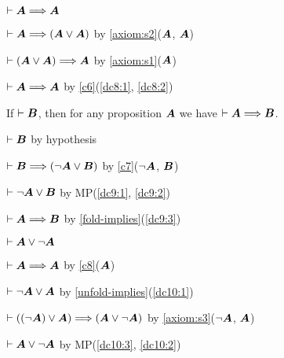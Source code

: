 \begin{dc}\label{c8}%
$\vdash\boldsymbol{A}\Longrightarrow\boldsymbol{A}$
\end{dc}

\begin{pf}
\item\label{dc8:1}\Pf $\vdash\boldsymbol{A}\Longrightarrow(\boldsymbol{A}\lor\boldsymbol{A})$
  by \ref{axiom:s2}($\boldsymbol{A}$, $\boldsymbol{A}$)
\item\label{dc8:2} $\vdash(\boldsymbol{A}\lor\boldsymbol{A})\Longrightarrow\boldsymbol{A}$
  by \ref{axiom:s1}($\boldsymbol{A}$)
\item $\vdash\boldsymbol{A}\Longrightarrow\boldsymbol{A}$ by
  \ref{c6}(\ref{dc8:1}, \ref{dc8:2})
\end{pf}

\begin{dc}\label{c9}%
If $\vdash\boldsymbol{B}$, then for any proposition $\boldsymbol{A}$
we have $\vdash\boldsymbol{A}\Longrightarrow\boldsymbol{B}$.
\end{dc}

\begin{pf}
\item\label{dc9:1}\Pf $\vdash\boldsymbol{B}$ by hypothesis
\item\label{dc9:2} $\vdash\boldsymbol{B}\Longrightarrow(\neg\boldsymbol{A}\lor\boldsymbol{B})$
  by \ref{c7}($\neg{\boldsymbol{A}}$, $\boldsymbol{B}$)
\item\label{dc9:3} $\vdash\neg\boldsymbol{A}\lor\boldsymbol{B}$ by
  MP(\ref{dc9:1}, \ref{dc9:2})
\item $\vdash\boldsymbol{A}\Longrightarrow\boldsymbol{B}$ by \ref{fold-implies}(\ref{dc9:3})
\end{pf}

\begin{dc}\label{c10}%
$\vdash\boldsymbol{A}\lor\neg\boldsymbol{A}$
\end{dc}
\begin{pf}
\item\label{dc10:1}\Pf $\vdash\boldsymbol{A}\Longrightarrow\boldsymbol{A}$
  by \ref{c8}($\boldsymbol{A}$)
\item\label{dc10:2} $\vdash\neg\boldsymbol{A}\lor\boldsymbol{A}$
  by \ref{unfold-implies}(\ref{dc10:1})
\item\label{dc10:3} $\vdash((\neg\boldsymbol{A})\lor\boldsymbol{A})\Longrightarrow(\boldsymbol{A}\lor\neg\boldsymbol{A})$
  by \ref{axiom:s3}($\neg\boldsymbol{A}$, $\boldsymbol{A}$)
\item $\vdash\boldsymbol{A}\lor\neg\boldsymbol{A}$ by
  MP(\ref{dc10:3}, \ref{dc10:2})
\end{pf}

